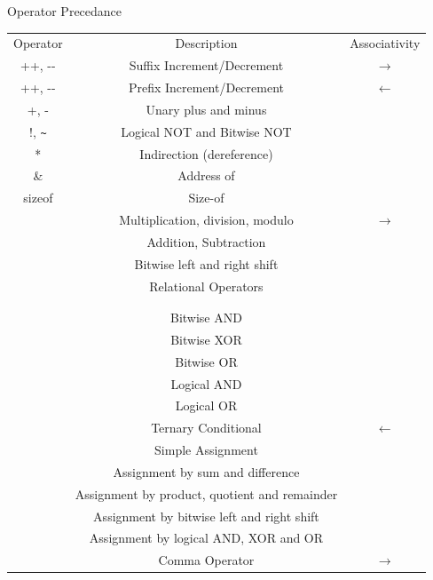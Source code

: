 \documentclass[10pt,t]{beamer}
\begin{document}
\begin{frame}[fragile]{Operator Precedance}
  \scriptsize{
    \begin{center}
      \begin{tabular}{ccc}
        \hline
        \rowcolor{lublue}Operator & Description & Associativity \\
        \rowcolor{lulime!60}++, {-}{-} & Suffix Increment/Decrement & $\rightarrow$ \\
        \rowcolor{lulime}++, {-}{-} & Prefix Increment/Decrement & $\leftarrow$ \\
        \rowcolor{lulime!60}+, - & Unary plus and minus &  \\
        \rowcolor{lulime}!, \Verb|~| & Logical NOT and Bitwise NOT & \\
        \rowcolor{lulime!60}* & Indirection (dereference) & \\
        \rowcolor{lulime}\& & Address of & \\
        \rowcolor{lulime!60}sizeof & Size-of & \\
        \rowcolor{lulime}{*, /, \%} & Multiplication, division, modulo & $\rightarrow$ \\
        \rowcolor{lulime!60}{+, -} & Addition, Subtraction & \\
        \rowcolor{lulime}{<<, >>} & Bitwise left and right shift & \\
        \rowcolor{lulime!60}{<, <=} & Relational Operators & \\ 
        \rowcolor{lulime}{>, >= } &  & \\ 
        \rowcolor{lulime!60}{==, !=} &  & \\ 
        \rowcolor{lulime}{\&} & Bitwise AND & \\
        \rowcolor{lulime!60}{\Verb|^|} & Bitwise XOR & \\
        \rowcolor{lulime}{|} & Bitwise OR & \\
        \rowcolor{lulime!60}{\&\&} & Logical AND & \\
        \rowcolor{lulime}{||} & Logical OR & \\
        \rowcolor{lulime!60}{?:} & Ternary Conditional & $\leftarrow$ \\
        \rowcolor{lulime}{=} & Simple Assignment &  \\
        \rowcolor{lulime!60}{+=, -=} & Assignment by sum and difference & \\
        \rowcolor{lulime}{*=, /=, \%=} & Assignment by product, quotient and remainder & \\
        \rowcolor{lulime!60}{<<=, >>=} & Assignment by bitwise left and right shift & \\
        \rowcolor{lulime}{\&=, \Verb|^=|, |=} & Assignment by logical AND, XOR and OR & \\
        \rowcolor{lulime!60}{,} & Comma Operator & $\rightarrow$ \\
        \hline
      \end{tabular}
    \end{center}
  }
\end{frame}
\end{document}
